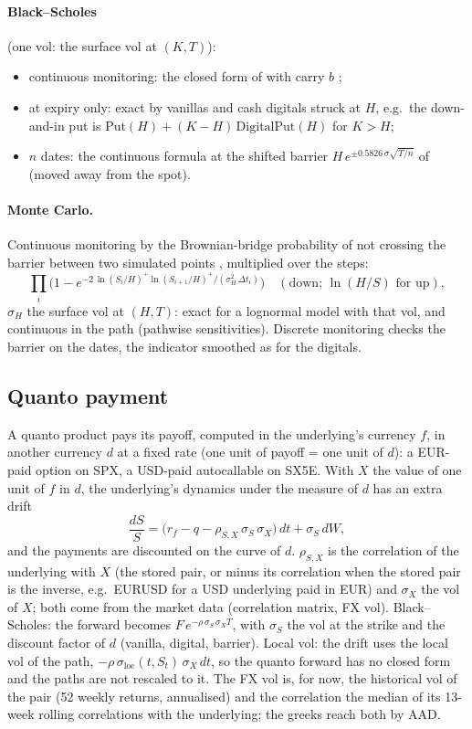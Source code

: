 \paragraph{Black--Scholes} (one vol: the surface vol at $(K, T)$):
\begin{itemize}[nosep]
  \item continuous monitoring: the closed form of \citet{reiner1991} with carry $b$ \citep{haug2007};
  \item at expiry only: exact by vanillas and cash digitals struck at $H$, e.g.\ the down-and-in put is
        $\mathrm{Put}(H) + (K - H)\,\mathrm{DigitalPut}(H)$ for $K > H$;
  \item $n$ dates: the continuous formula at the shifted barrier $H\,e^{\pm 0.5826\,\sigma\sqrt{T/n}}$ of \citet{broadie1997} (moved away
        from the spot).
\end{itemize}

\paragraph{Monte Carlo.} Continuous monitoring by the Brownian-bridge probability of not crossing the barrier between
two simulated points \citep{beaglehole1997,glasserman2003}, multiplied over the steps:
\[
  \prod_i \Big(1 - e^{-2\,\ln(S_i/H)^+ \ln(S_{i+1}/H)^+/(\sigma_H^2\,\Delta t_i)}\Big)\quad(\text{down; } \ln(H/S) \text{ for up}),
\]
$\sigma_H$ the surface vol at $(H, T)$: exact for a lognormal model with that vol, and continuous in the path (pathwise
sensitivities). Discrete monitoring checks the barrier on the dates, the indicator smoothed as for the digitals.

\subsection{Quanto payment}\label{sec:mp-quanto}
A quanto product pays its payoff, computed in the underlying's currency $f$, in another currency $d$ at a fixed rate
(one unit of payoff = one unit of $d$): a EUR-paid option on SPX, a USD-paid autocallable on SX5E. With $X$ the value of
one unit of $f$ in $d$, the underlying's dynamics under the measure of $d$ has an extra drift
\[
  \frac{dS}{S} = \big(r_f - q - \rho_{S,X}\,\sigma_S\,\sigma_X\big)\,dt + \sigma_S\,dW,
\]
and the payments are discounted on the curve of $d$. $\rho_{S,X}$ is the correlation of the underlying with $X$ (the
stored pair, or minus its correlation when the stored pair is the inverse, e.g.\ EURUSD for a USD underlying paid in
EUR) and $\sigma_X$ the vol of $X$; both come from the market data (correlation matrix, FX vol). Black--Scholes: the
forward becomes $F\,e^{-\rho\,\sigma_S\,\sigma_X T}$, with $\sigma_S$ the vol at the strike and the discount factor of
$d$ (vanilla, digital, barrier). Local vol: the drift uses the local vol of the path,
$-\rho\,\sigma_{\mathrm{loc}}(t, S_t)\,\sigma_X\,dt$, so the quanto forward has no closed form and the paths are not
rescaled to it. The FX vol is, for now, the historical vol of the pair (52 weekly returns, annualised) and the
correlation the median of its 13-week rolling correlations with the underlying; the greeks reach both by AAD.

